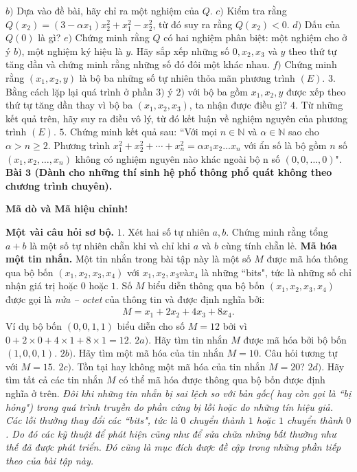 \begin{multicols}{2}
	\vskip 0.1cm
	$b)$ Dựa vào đề bài, hãy chỉ ra một nghiệm của $Q$.
	\vskip 0.1cm
	$c)$ Kiểm tra rằng $Q(x_2 )=(3- \alpha x_1 )x_2^2+x_1^2-x_2^2$, từ đó suy ra rằng $Q(x_2 )<0$.
	\vskip 0.1cm 
	$d)$ Dấu của $Q(0)$ là gì?
	\vskip 0.1cm 
	$e)$ Chứng minh rằng $Q$ có hai nghiệm phân biệt: một nghiệm cho ở ý $b)$, một nghiệm ký hiệu là $y$. Hãy sắp xếp những số $0,x_2,x_3$ và $y$ theo thứ tự tăng dần và chứng minh rằng những số đó đôi một khác nhau. 
	\vskip 0.1cm
	$f)$ Chứng minh rằng $(x_1,x_2,y)$ là bộ ba những số tự nhiên thỏa mãn phương trình $(E)$.
	\vskip 0.1cm 
	$3.$ Bằng cách lặp lại quá trình ở phần $3)$ ý $2)$ với bộ ba gồm $x_1,x_2,y$ được xếp theo thứ tự tăng dần thay vì bộ ba $(x_1,x_2,x_3)$, ta nhận được điều gì?
	\vskip 0.1cm
	$4.$ Từ những kết quả trên, hãy suy ra điều vô lý, từ đó kết luận về nghiệm nguyên của phương trình $(E)$.
	\vskip 0.1cm
	$5.$ Chứng minh kết quả sau: ``Với mọi $n \in \mathbb{N}$ và  $\alpha \in \mathbb{N}$ sao cho  $\alpha>n\ge2$. Phương trình $x_1^2+x_2^2+⋯+x_n^2= \alpha x_1 x_2\ldots x_n$  với ẩn số là bộ gồm $n$ số $(x_1,x_2,\ldots,x_n)$ không có nghiệm nguyên nào khác ngoài bộ n số $(0,0,\ldots,0)$". 
	\vskip 0.1cm
	 \textbf{\color{cackithi}Bài $\pmb{3}$ (Dành cho những thí sinh hệ phổ thông phổ quát không theo chương trình chuyên).} 
	\vskip 0.1cm
	\centerline{ \textbf{\color{cackithi}Mã dò và Mã hiệu chỉnh!}}
	\vskip 0.1cm 
	 \textbf{\color{cackithi}Một vài câu hỏi sơ bộ.}
	\vskip 0.1cm
	$1.$ Xét hai số tự nhiên $a,b$. Chứng minh rằng tổng $a+b$ là một số tự nhiên chẵn khi và chỉ khi $a$ và $b$ cùng tính chẵn lẻ. 
	\vskip 0.1cm
	 \textbf{\color{cackithi}Mã hóa một tin nhắn.}
	\vskip 0.1cm
	Một tin nhắn trong bài tập này là một số $M$ được mã hóa thông qua bộ bốn $(x_1,x_2,x_3,x_4)$ với $x_1,x_2,x_3 và x_4$ là những ``bits", tức là những số chỉ nhận giá trị hoặc $0$ hoặc $1$. Số $M$ biểu diễn thông qua bộ bốn $(x_1,x_2,x_3,x_4)$ được gọi là \textit{nửa -- octet} của thông tin và được định nghĩa bởi: 
	\begin{align*}
		M=x_1+2x_2+4x_3+8x_4.
	\end{align*}
	Ví dụ bộ bốn $(0,0,1,1)$ biểu diễn cho số $M=12$ bởi vì $0+2 \times 0+4×1+8 \times 1=12$. 
	\vskip 0.1cm
	$2a)$. Hãy tìm tin nhắn $M$ được mã hóa bởi bộ bốn $(1,0,0,1)$.
	\vskip 0.1cm
	$2b)$. Hãy tìm một mã hóa của tin nhắn $M=10$. Câu hỏi tương tự với $M=15$.
	\vskip 0.1cm
	$2c)$. Tồn tại hay không một mã hóa của tin nhắn $M=20$? 
	\vskip 0.1cm
	$2d)$. Hãy tìm tất cả các tin nhắn $M$ có thể mã hóa được thông qua bộ bốn được định nghĩa ở trên. 
	\vskip 0.1cm
	\textit{Đôi khi những tin nhắn bị sai lệch so với bản gốc( hay còn gọi là ``bị hỏng") trong quá trình truyền do phần cứng bị lỗi hoặc do những tín hiệu giả. Các lỗi thường thay đổi các ``bits", tức là $0$ chuyển thành $1$ hoặc $1$ chuyển thành $0$. Do đó các kỹ thuật để phát hiện cũng như để sửa chữa những bất thường như thế đã được phát triển. Đó cũng là mục đích được đề cập trong những phần tiếp theo của bài tập này.}

\end{multicols}
